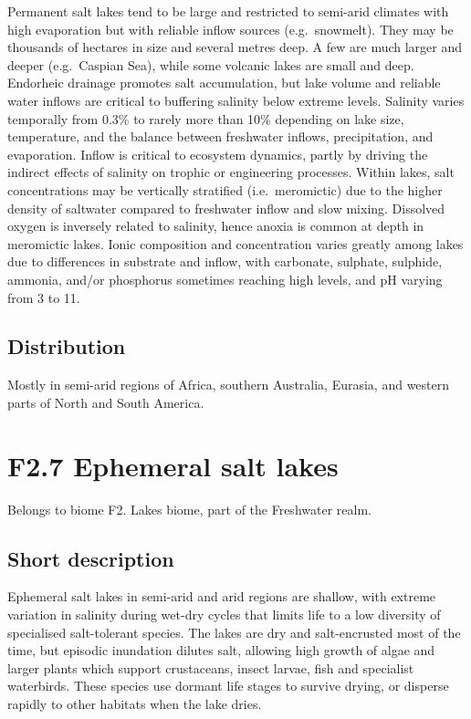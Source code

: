 \documentclass[
  letterpaper,
  DIV=11,
  numbers=noendperiod]{scrartcl}
\begin{document}
Permanent salt lakes tend to be large and restricted to semi-arid
climates with high evaporation but with reliable inflow sources
(e.g.~snowmelt). They may be thousands of hectares in size and several
metres deep. A few are much larger and deeper (e.g.~Caspian Sea), while
some volcanic lakes are small and deep. Endorheic drainage promotes salt
accumulation, but lake volume and reliable water inflows are critical to
buffering salinity below extreme levels. Salinity varies temporally from
0.3\% to rarely more than 10\% depending on lake size, temperature, and
the balance between freshwater inflows, precipitation, and evaporation.
Inflow is critical to ecosystem dynamics, partly by driving the indirect
effects of salinity on trophic or engineering processes. Within lakes,
salt concentrations may be vertically stratified (i.e.~meromictic) due
to the higher density of saltwater compared to freshwater inflow and
slow mixing. Dissolved oxygen is inversely related to salinity, hence
anoxia is common at depth in meromictic lakes. Ionic composition and
concentration varies greatly among lakes due to differences in substrate
and inflow, with carbonate, sulphate, sulphide, ammonia, and/or
phosphorus sometimes reaching high levels, and pH varying from 3 to 11.

\subsection{Distribution}\label{distribution-13}

Mostly in semi-arid regions of Africa, southern Australia, Eurasia, and
western parts of North and South America.

\section{F2.7 Ephemeral salt lakes}\label{f2.7-ephemeral-salt-lakes}

Belongs to biome F2. Lakes biome, part of the Freshwater realm.

\subsection{Short description}\label{short-description-14}

Ephemeral salt lakes in semi-arid and arid regions are shallow, with
extreme variation in salinity during wet-dry cycles that limits life to
a low diversity of specialised salt-tolerant species. The lakes are dry
and salt-encrusted most of the time, but episodic inundation dilutes
salt, allowing high growth of algae and larger plants which support
crustaceans, insect larvae, fish and specialist waterbirds. These
species use dormant life stages to survive drying, or disperse rapidly
to other habitats when the lake dries.
\end{document}
